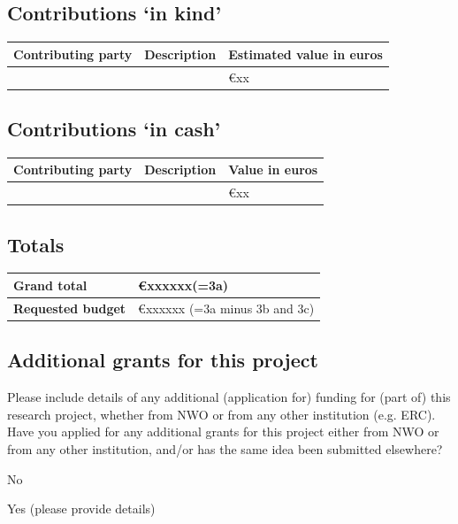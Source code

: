 \documentclass[10pt]{article}
\newcommand{\cmark}{$\checkmark$}%
\newcommand{\done}{\rlap{\color{sectionblue}$\square$}{\raisebox{2pt}{\large\hspace{1pt}\cmark}}\hspace{-2.5pt}}
\newcommand{\tableheadfont}{\bfseries\fontsize{10}{10}\selectfont\leavevmode\color{tableblue}}
\begin{document}
	\subsection{Contributions `in kind'}

	{\renewcommand{\arraystretch}{1.5}
	\begin{tabularx}{\linewidth}{|X|X|X|}
		\arrayrulecolor[gray]{0.4}\hline
		\rowcolor[gray]{0.8} {\tableheadfont Contributing party} & {\tableheadfont Description } & {\tableheadfont Estimated value in euros} \\\hline 
	 & & €xx\\\hline
	\end{tabularx}
	}

	\subsection{Contributions `in cash'}

	{\renewcommand{\arraystretch}{1.5}
	\begin{tabularx}{\linewidth}{|X|X|X|}
		\arrayrulecolor[gray]{0.4}\hline
		\rowcolor[gray]{0.8} {\tableheadfont Contributing party} & {\tableheadfont Description } & {\tableheadfont Value in euros} \\\hline 
		& & €xx\\\hline
	\end{tabularx}
	}
	
	\subsection{Totals}
	{\renewcommand{\arraystretch}{1.5}
	\begin{tabularx}{\linewidth}{|p{3cm}|X|}
		\arrayrulecolor[gray]{0.4}\hline
		{\cellcolor[gray]{0.8}\tableheadfont Grand total} & €xxxxxx\quad (=3a) \\\hline 
		{\cellcolor[gray]{0.8}\tableheadfont Requested budget} & €xxxxxx \quad (=3a minus 3b and 3c) \\\hline 
	\end{tabularx}
	}

	\subsection{Additional grants for this project}
	Please include details of any additional (application for) funding for (part of) this research project, whether from NWO or from any other institution (e.g. ERC).
	Have you applied for any additional grants for this project either from NWO or from any other institution, 	and/or has the same idea been submitted elsewhere?
	\begin{todolist}
	\item[\done] No 
	\item Yes (please provide details)
	\end{todolist}
\end{document}
